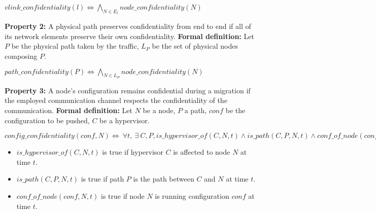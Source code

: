 \begin{myformula}
$vlink\_confidentiality(l) \Leftrightarrow \bigwedge\limits_{N\in E_l} node\_confidentiality(N) $
\end{myformula}

\textbf{Property 2:} A physical path preserves confidentiality from end to end if all of its network elements preserve their own confidentiality.
\newline \textbf{Formal definition:} Let $P$ be the physical path taken by the traffic, $L_P$ be the set of physical nodes composing $P$.

\begin{myformula}
$path\_confidentiality(P) \Leftrightarrow \bigwedge\limits_{N \in L_P}node\_confidentiality(N)$
\end{myformula}


\textbf{Property 3:} A node's configuration remains confidential during a migration if the employed communication channel respects the confidentiality of the communication.
\newline \textbf{Formal definition:} Let $N$ be a node, $P$ a path, $conf$ be the configuration to be pushed, $C$ be a hypervisor.

\begin{myformula}
$config\_confidentiality(conf,N) \Leftrightarrow~\forall t,~\exists~C,P, 
is\_hypervisor\_of(C,N,t) \wedge is\_path(C,P,N,t) \wedge  conf\_of\_node(conf,N,t) \Rightarrow
~path\_confidentiality(P) \wedge  node\_confidentiality(N)
$
\end{myformula}


\begin{itemize}
\item $is\_hypervisor\_of(C,N,t)$ is true if hypervisor $C$ is affected to node $N$ at time $t$. 
\item $is\_path(C,P,N,t)$ is true if path $P$ is the path between $C$ and $N$ at time $t$.
\item $conf\_of\_node(conf,N,t)$ is true if node $N$ is running configuration $conf$ at time $t$.
\end{itemize}


